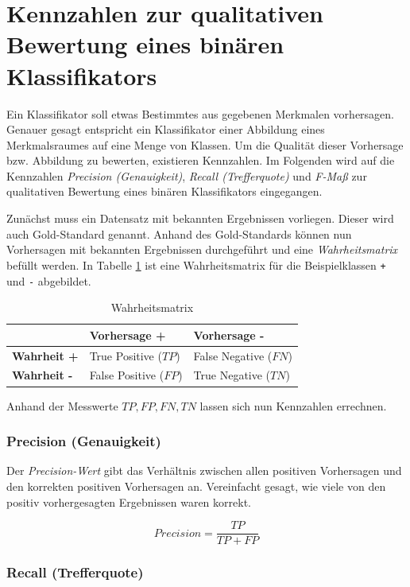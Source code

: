 \section{Kennzahlen zur qualitativen Bewertung eines binären Klassifikators}
\label{sec:appenix:fmeasure}

Ein Klassifikator soll etwas Bestimmtes aus gegebenen Merkmalen vorhersagen.
Genauer gesagt entspricht ein Klassifikator einer Abbildung eines Merkmalsraumes auf eine Menge von Klassen.
Um die Qualität dieser Vorhersage bzw. Abbildung zu bewerten, existieren Kennzahlen.
Im Folgenden wird auf die Kennzahlen \textit{Precision (Genauigkeit)}, \textit{Recall (Trefferquote)} und \textit{F-Maß} zur qualitativen Bewertung eines binären Klassifikators eingegangen.

Zunächst muss ein Datensatz mit bekannten Ergebnissen vorliegen.
Dieser wird auch Gold-Standard genannt.
Anhand des Gold-Standards können nun Vorhersagen mit bekannten Ergebnissen durchgeführt und eine \textit{Wahrheitsmatrix} befüllt werden. In Tabelle \ref{tab:wahrheitsmatrix} ist eine Wahrheitsmatrix für die Beispielklassen \texttt{+} und \texttt{-} abgebildet. 
\begin{table}[]
\centering
\caption{Wahrheitsmatrix}
\label{tab:wahrheitsmatrix}
\begin{tabular}{|l|l|l|}
\hline
\textbf{}           & \textbf{Vorhersage +} & \textbf{Vorhersage -} \\ \hline
\textbf{Wahrheit +} & True Positive ($TP$)    & False Negative ($FN$)   \\ \hline
\textbf{Wahrheit -} & False Positive ($FP$)   & True Negative ($TN$)    \\ \hline
\end{tabular}
\end{table}

Anhand der Messwerte $TP, FP, FN, TN$ lassen sich nun Kennzahlen errechnen.

\subsubsection{Precision (Genauigkeit)}

Der \textit{Precision-Wert} gibt das Verhältnis zwischen allen positiven Vorhersagen und den korrekten positiven Vorhersagen an. Vereinfacht gesagt, wie viele von den positiv vorhergesagten Ergebnissen waren korrekt.

$$Precision = \frac{TP}{TP + FP}$$

\subsubsection{Recall (Trefferquote)}

